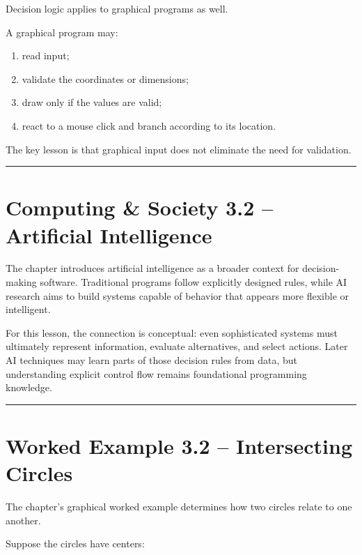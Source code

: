 \documentclass[
  11pt,
  a4paper,
]{article}
\providecommand{\tightlist}{%
  \setlength{\itemsep}{0pt}\setlength{\parskip}{0pt}}
\begin{document}
Decision logic applies to graphical programs as well.

A graphical program may:

\begin{enumerate}
\def\labelenumi{\arabic{enumi}.}
\tightlist
\item
  read input;
\item
  validate the coordinates or dimensions;
\item
  draw only if the values are valid;
\item
  react to a mouse click and branch according to its location.
\end{enumerate}

The key lesson is that graphical input does not eliminate the need for
validation.

\begin{center}\rule{0.5\linewidth}{0.5pt}\end{center}

\section{Computing \& Society 3.2 -- Artificial
Intelligence}\label{computing-society-3.2-artificial-intelligence}

The chapter introduces artificial intelligence as a broader context for
decision-making software. Traditional programs follow explicitly
designed rules, while AI research aims to build systems capable of
behavior that appears more flexible or intelligent.

For this lesson, the connection is conceptual: even sophisticated
systems must ultimately represent information, evaluate alternatives,
and select actions. Later AI techniques may learn parts of those
decision rules from data, but understanding explicit control flow
remains foundational programming knowledge.

\begin{center}\rule{0.5\linewidth}{0.5pt}\end{center}

\section{Worked Example 3.2 -- Intersecting
Circles}\label{worked-example-3.2-intersecting-circles}

The chapter's graphical worked example determines how two circles relate
to one another.

Suppose the circles have centers:
\end{document}
